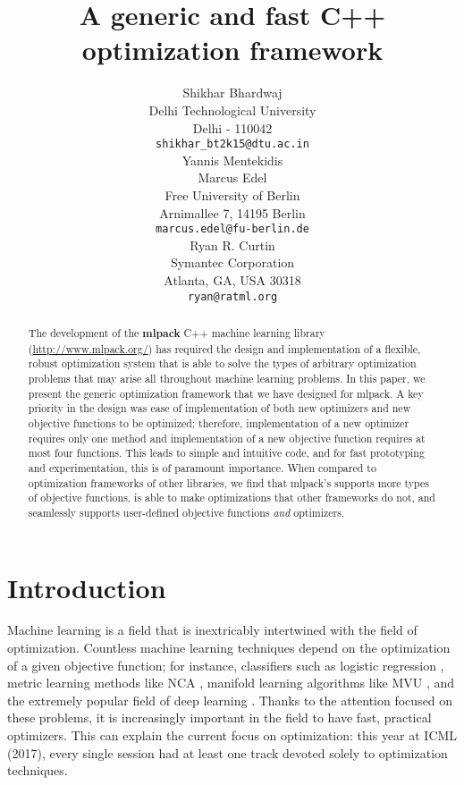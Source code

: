 \documentclass{article}
\title{A generic and fast C++ optimization framework}
\author{
  Shikhar Bhardwaj \\
  Delhi Technological University \\
  Delhi - 110042 \\
  \texttt{shikhar_bt2k15@dtu.ac.in} \\
  \AND
  Yannis Mentekidis \\
  \AND
  Marcus Edel \\
  Free University of Berlin \\
  Arnimallee 7, 14195 Berlin \\
  \texttt{marcus.edel@fu-berlin.de} \\
  \AND
  Ryan R. Curtin \\
  Symantec Corporation \\
  Atlanta, GA, USA 30318 \\
  \texttt{ryan@ratml.org} \\
}
\begin{document}

\maketitle

\begin{abstract}
The development of the {\bf mlpack} C++ machine learning library
(\url{http://www.mlpack.org/}) has required the design and implementation of a
flexible, robust optimization system that is able to solve the types of
arbitrary optimization problems that may arise all throughout machine learning
problems.  In this paper, we present the generic optimization framework that we
have designed for mlpack.  A key priority in the design was ease of
implementation of both new optimizers and new objective functions to be
optimized; therefore, implementation of a new optimizer requires only one
method and implementation of a new objective function requires at most four
functions.  This leads to simple and intuitive code, and for fast prototyping
and experimentation, this is of paramount importance.  When compared to
optimization frameworks of other libraries, we find that mlpack's supports more
types of objective functions, is able to make optimizations that other
frameworks do not, and seamlessly supports user-defined objective functions
{\it and} optimizers.
%
\end{abstract}

\section{Introduction}

Machine learning is a field that is inextricably intertwined with the field of
optimization.  Countless machine learning techniques depend on the optimization
of a given objective function; for instance, classifiers such as logistic
regression \cite{cox1958regression}, metric learning methods like NCA
\cite{goldberger2005neighbourhood}, manifold learning algorithms like MVU
\cite{weinberger2006introduction}, and the extremely popular field of deep
learning \cite{schmidhuber2015deep}.  Thanks to the attention focused on these
problems, it is increasingly important in the field to have fast, practical
optimizers.  This can explain the current focus on optimization: this year at
ICML (2017), every single session had at least one track devoted solely to
optimization techniques.
\end{document}
